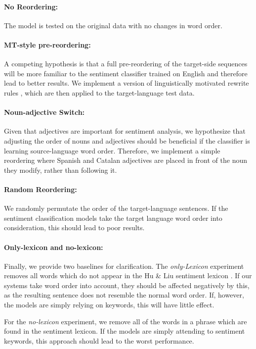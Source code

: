 \documentclass[11pt,a4paper]{article}
\begin{document}
\paragraph{No Reordering: }The model is tested on the original data with no changes in word order.

\paragraph{MT-style pre-reordering: }A competing hypothesis is that a full pre-reordering of the target-side sequences will be more familiar to the sentiment classifier trained on English and therefore lead to better results. We implement a version of linguistically motivated rewrite rules \cite{Crego2006,Crego2006b}, which are then applied to the target-language test data.

\paragraph{Noun-adjective Switch: }Given that adjectives are important for sentiment analysis, we hypothesize that adjusting the order of nouns and adjectives should be beneficial if the classifier is learning source-language word order. Therefore, we implement a simple reordering where Spanish and Catalan adjectives are placed in front of the noun they modify, rather than following it.

\paragraph{Random Reordering: }We randomly permutate the order of the target-language sentences. If the sentiment classification models take the target language word order into consideration, this should lead to poor results.

\paragraph{Only-lexicon and no-lexicon: }Finally, we provide two baselines for clarification. The \emph{only-Lexicon} experiment removes all words which do
not appear in the Hu \& Liu sentiment lexicon \cite{HuandLiu2004}. If our systems
take word order into account, they should be affected negatively by this, as the
resulting sentence does not resemble the normal word order. If, however, the models
are simply relying on keywords, this will have little effect.

For the \emph{no-lexicon} experiment, we remove all of the words
in a phrase which are found in the sentiment lexicon. If the models are simply attending to
sentiment keywords, this approach should lead to the worst performance. 
\end{document}
